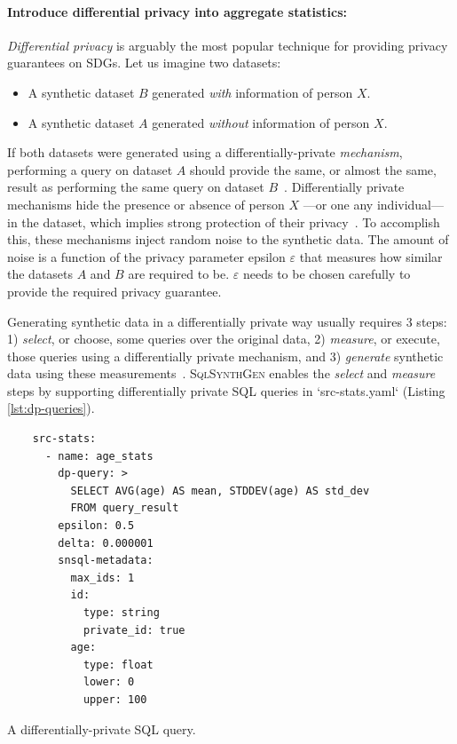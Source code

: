 \documentclass[11pt]{article}
\begin{document}
\paragraph{Introduce differential privacy into aggregate statistics:}

\emph{Differential privacy} is arguably the most popular technique for providing privacy guarantees on SDGs.
Let us imagine two datasets:

\begin{itemize}
    \item A synthetic dataset $B$ generated \emph{with} information of person $X$.
    \item A synthetic dataset $A$ generated \emph{without} information of person $X$.
\end{itemize}

If both datasets were generated using a differentially-private \emph{mechanism}, performing a query on dataset $A$ should provide the same, or almost the same, result as performing the same query on dataset $B$~\cite{Kopp2021MicrosoftSD}.
Differentially private mechanisms hide the presence or absence of person $X$ ---or one any individual--- in the dataset, which implies strong protection of their privacy~\cite{near2021}.
To accomplish this, these mechanisms inject random noise to the synthetic data.
The amount of noise is a function of the privacy parameter epsilon $\varepsilon$ that measures how similar the datasets $A$ and $B$ are required to be. $\varepsilon$ needs to be
chosen carefully to provide the required privacy guarantee.

Generating synthetic data in a differentially private way usually requires 3 steps: 1) \emph{select}, or choose, some queries over the original data, 2) \emph{measure}, or execute, those queries using a differentially private mechanism, and 3) \emph{generate} synthetic data using these measurements~\cite{DBLP:journals/pvldb/McKennaMSM22}.
\textsc{SqlSynthGen} enables the \emph{select} and \emph{measure} steps by supporting differentially private SQL queries in `src-stats.yaml`  (Listing \ref{lst:dp-queries}).

\begin{listing}[H]
\begin{verbatim}
    src-stats:
      - name: age_stats
        dp-query: >
          SELECT AVG(age) AS mean, STDDEV(age) AS std_dev
          FROM query_result
        epsilon: 0.5
        delta: 0.000001
        snsql-metadata:
          max_ids: 1
          id:
            type: string
            private_id: true
          age:
            type: float
            lower: 0
            upper: 100
\end{verbatim}
\caption{A differentially-private SQL query. }
\label{lst:dp-queries}
\end{listing}
\end{document}
